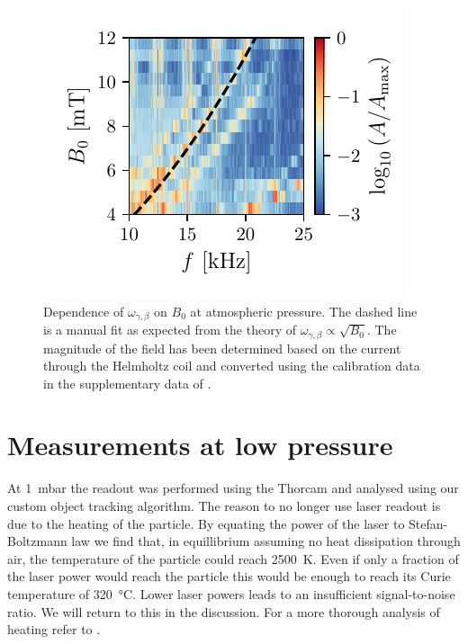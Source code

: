 \begin{figure}
    \includegraphics{figures/data/librational_mode_dependence_on_B0.pdf}
    \caption{Dependence of $\omega_{\gamma,\beta}$ on $B_0$ at atmospheric pressure. The dashed line is a manual fit as expected from the theory of $\omega_{\gamma,\beta} \propto \sqrt{B_0}$. The magnitude of the field has been determined based on the current through the Helmholtz coil and converted using the calibration data in the supplementary data of \textcite{janse_characterization_2024}.}
    \label{fig:librational-mode-dependence-magnetic-field-1bar}
\end{figure}

\section{Measurements at low pressure}
\label{sec:measurements-at-low-pressure}
At \qty{1}{\milli\bar} the readout was performed using the Thorcam and analysed using our custom object tracking algorithm. The reason to no longer use laser readout is due to the heating of the particle. By equating the power of the laser to Stefan-Boltzmann law we find that, in equillibrium assuming no heat dissipation through air, the temperature of the particle could reach \qty{2500}{\kelvin}. Even if only a fraction of the laser power would reach the particle this would be enough to reach its Curie temperature of \qty{320}{\celsius}\cite{magnequench}. Lower laser powers leads to an insufficient signal-to-noise ratio. We will return to this in the discussion. For a more thorough analysis of heating refer to \cite{millen}.

